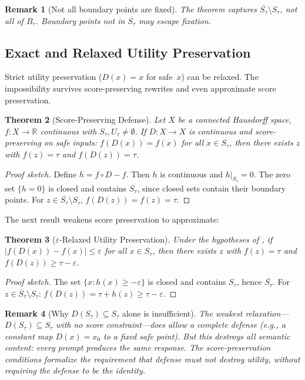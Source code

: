 \documentclass[11pt]{article}
\newtheorem{theorem}{Theorem}[section]
\newtheorem{remark}[theorem]{Remark}
\newcommand{\R}{\mathbb{R}}
\newcommand{\cl}[1]{\overline{#1}}
\begin{document}
\begin{remark}[Not all boundary points are fixed]
The theorem captures $\cl{S_\tau} \setminus S_\tau$, not all of
$B_\tau$. Boundary points not in $\cl{S_\tau}$ may escape fixation.
\end{remark}


\subsection{Exact and Relaxed Utility Preservation}
\label{sec:relaxed}

Strict utility preservation ($D(x) = x$ for safe~$x$) can be
relaxed. The impossibility survives score-preserving rewrites and
even approximate score preservation.

\begin{theorem}[Score-Preserving Defense]
\label{thm:score-preserving}
Let $X$ be a connected Hausdorff space, $f\colon X\to\R$ continuous
with $S_\tau, U_\tau \neq \emptyset$. If $D\colon X \to X$ is
continuous and \emph{score-preserving on safe inputs}:
$f(D(x)) = f(x)$ for all $x \in S_\tau$, then there exists $z$ with
$f(z) = \tau$ and $f(D(z)) = \tau$.
\end{theorem}

\begin{proof}[Proof sketch]
Define $h = f \circ D - f$. Then $h$ is continuous and $h|_{S_\tau} = 0$.
The zero set $\{h = 0\}$ is closed and contains $\cl{S_\tau}$, since closed sets contain their boundary points. For
$z \in \cl{S_\tau} \setminus S_\tau$, $f(D(z)) = f(z) = \tau$.
\end{proof}

The next result weakens score preservation to approximate:

\begin{theorem}[$\varepsilon$-Relaxed Utility Preservation]
\label{thm:eps-relaxed}
Under the hypotheses of , if
$|f(D(x)) - f(x)| \leq \varepsilon$ for all $x \in S_\tau$, then
there exists $z$ with $f(z) = \tau$ and
$f(D(z)) \geq \tau - \varepsilon$.
\end{theorem}

\begin{proof}[Proof sketch]
The set $\{x : h(x) \geq -\varepsilon\}$ is closed and contains
$S_\tau$, hence $\cl{S_\tau}$. For
$z \in \cl{S_\tau} \setminus S_\tau$:
$f(D(z)) = \tau + h(z) \geq \tau - \varepsilon$.
\end{proof}


\begin{remark}[Why $D(S_\tau) \subseteq S_\tau$ alone is insufficient]
\label{rem:safe-preserving-escape}
The weakest relaxation---$D(S_\tau) \subseteq S_\tau$ with no score
constraint---does allow a complete defense (e.g., a constant map
$D(x) = x_0$ to a fixed safe point). But this destroys all semantic
content: every prompt produces the same response. The score-preservation
conditions formalize the requirement that defense must not destroy
utility, without requiring the defense to be the identity.
\end{remark}
\end{document}
